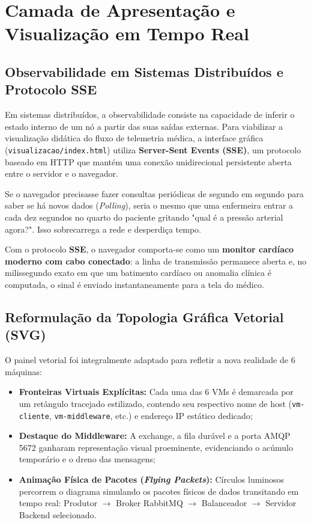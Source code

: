 \documentclass[11pt,a4paper]{article}
\begin{document}
\section{Camada de Apresentação e Visualização em Tempo Real}

\subsection{Observabilidade em Sistemas Distribuídos e Protocolo SSE}

Em sistemas distribuídos, a observabilidade consiste na capacidade de inferir o estado interno de um nó a partir das suas saídas externas. Para viabilizar a visualização didática do fluxo de telemetria médica, a interface gráfica (\texttt{visualizacao/index.html}) utiliza \textbf{Server-Sent Events (SSE)}, um protocolo baseado em HTTP que mantém uma conexão unidirecional persistente aberta entre o servidor e o navegador.

\begin{analogia}
Se o navegador precisasse fazer consultas periódicas de segundo em segundo para saber se há novos dados (\textit{Polling}), seria o mesmo que uma enfermeira entrar a cada dez segundos no quarto do paciente gritando "qual é a pressão arterial agora?". Isso sobrecarrega a rede e desperdiça tempo. 

Com o protocolo \textbf{SSE}, o navegador comporta-se como um \textbf{monitor cardíaco moderno com cabo conectado}: a linha de transmissão permanece aberta e, no milissegundo exato em que um batimento cardíaco ou anomalia clínica é computada, o sinal é enviado instantaneamente para a tela do médico.
\end{analogia}

\subsection{Reformulação da Topologia Gráfica Vetorial (SVG)}

O painel vetorial foi integralmente adaptado para refletir a nova realidade de 6 máquinas:
\begin{itemize}
    \item \textbf{Fronteiras Virtuais Explícitas:} Cada uma das 6 VMs é demarcada por um retângulo tracejado estilizado, contendo seu respectivo nome de host (\texttt{vm-cliente}, \texttt{vm-middleware}, etc.) e endereço IP estático dedicado;
    \item \textbf{Destaque do Middleware:} A exchange, a fila durável e a porta AMQP 5672 ganharam representação visual proeminente, evidenciando o acúmulo temporário e o dreno das mensagens;
    \item \textbf{Animação Física de Pacotes (\textit{Flying Packets}):} Círculos luminosos percorrem o diagrama simulando os pacotes físicos de dados transitando em tempo real: Produtor $\to$ Broker RabbitMQ $\to$ Balanceador $\to$ Servidor Backend selecionado.
\end{itemize}
\end{document}
